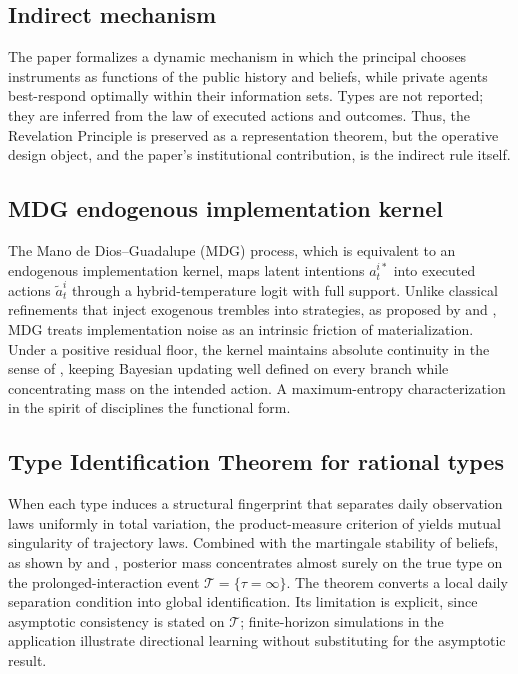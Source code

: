\documentclass[pdflatex,sn-mathphys-ay]{sn-jnl}
\theoremstyle{plain}
\theoremstyle{definition}
\newcommand{\1}{\mathbf{1}}
\begin{document}
\subsection*{Indirect mechanism}
The paper formalizes a dynamic mechanism in which the principal chooses instruments as functions of the public history and beliefs, while private agents best-respond optimally within their information sets. Types are not reported; they are inferred from the law of executed actions and outcomes. Thus, the Revelation Principle is preserved as a representation theorem, but the operative design object, and the paper's institutional contribution, is the indirect rule itself.

\subsection*{MDG endogenous implementation kernel}
The Mano de Dios--Guadalupe (MDG) process, which is equivalent to an endogenous implementation kernel, maps latent intentions $a_t^{i\ast}$ into executed actions $\tilde a_t^i$ through a hybrid-temperature logit with full support. Unlike classical refinements that inject exogenous trembles into strategies, as proposed by \citet{Selten1975Perfectness} and \citet{KrepsWilson1982}, MDG treats implementation noise as an intrinsic friction of materialization. Under a positive residual floor, the kernel maintains absolute continuity in the sense of \citet{KalaiLehrer1993}, keeping Bayesian updating well defined on every branch while concentrating mass on the intended action. A maximum-entropy characterization in the spirit of \citet{Jaynes1957Information} disciplines the functional form.

\subsection*{Type Identification Theorem for rational types}
When each type induces a structural fingerprint that separates daily observation laws uniformly in total variation, the product-measure criterion of \citet{Kakutani1948} yields mutual singularity of trajectory laws. Combined with the martingale stability of beliefs, as shown by \citet{Doob1953Stochastic} and \citet{BlackwellDubins1962}, posterior mass concentrates almost surely on the true type on the prolonged-interaction event $\mathcal{T}=\{\tau=\infty\}$. The theorem converts a local daily separation condition into global identification. Its limitation is explicit, since asymptotic consistency is stated on $\mathcal{T}$; finite-horizon simulations in the application illustrate directional learning without substituting for the asymptotic result.
\end{document}
